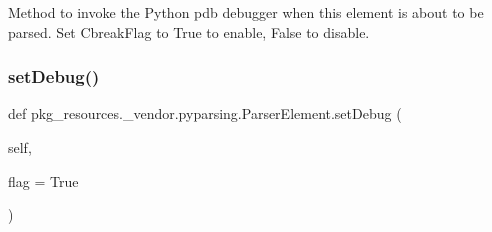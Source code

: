 \begin{DoxyVerb}Method to invoke the Python pdb debugger when this element is
   about to be parsed. Set C{breakFlag} to True to enable, False to
   disable.
\end{DoxyVerb}
 \mbox{\label{classpkg__resources_1_1__vendor_1_1pyparsing_1_1_parser_element_a40898433962bb7ed5fb13e32e924bd0e}} 
\subsubsection{\texorpdfstring{set\+Debug()}{setDebug()}}
{\footnotesize\ttfamily def pkg\+\_\+resources.\+\_\+vendor.\+pyparsing.\+Parser\+Element.\+set\+Debug (\begin{DoxyParamCaption}\item[{}]{self,  }\item[{}]{flag = {\ttfamily True} }\end{DoxyParamCaption})}

